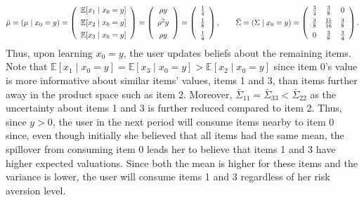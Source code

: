 \documentclass[manuscript]{acmart}
\begin{document}
\[ \bar{\mu} = (\mu \mid x_0=y) =  \left (\begin{array}{c}
\mathbb{E}[x_1\mid x_0=y] \vspace{0.15cm} \\
\mathbb{E}[x_2\mid x_0=y] \vspace{0.15cm} \\
\mathbb{E}[x_3\mid x_0=y]
\end{array}  \right) =\left (\begin{array}{c}
\rho y  \vspace{0.15cm} \\
\rho^{2} y  \vspace{0.15cm} \\
 \rho y \\
\end{array} \right) =
\left (\begin{array}{c}
\frac{1}{4} \vspace{0.15cm} \\
\frac{1}{8}  \vspace{0.15cm} \\
\frac{1}{4}
\end{array}  \right),\qquad 
\bar{\Sigma} =(\Sigma\mid x_0=y)=  \left( \begin{array}{ccc}
\frac{3}{4} & \frac{3}{8} & 0 \vspace{0.15cm} \\
\frac{3}{8} & \frac{15}{16} & \frac{3}{8} \vspace{0.15cm}  \\
0 &\frac{3}{8} & \frac{3}{4}  \\
\end{array} \right).
\]
Thus, upon learning $x_0=y$, the user updates beliefs about the remaining items. Note that $\mathbb{E}[x_1\mid x_0=y] = \mathbb{E}[x_3\mid x_0=y] > \mathbb{E}[x_2\mid x_0=y]$ since item 0's value is more informative about similar items' values, items 1 and 3, than items further away in the product space such as item 2. Moreover, $\bar{\Sigma}_{11} = \bar{\Sigma}_{33} < \bar{\Sigma}_{22}$ as the uncertainty about items 1 and 3 is further reduced compared to item 2. Thus, since $y > 0$, the user in the next period will consume items nearby to item 0 since, even though initially she believed that all items had the same mean, the spillover from consuming item 0 leads her to believe that items 1 and 3 have higher expected valuations. Since both the mean is higher for these items and the variance is lower, the user will consume items 1 and 3 regardless of her risk aversion level.
\par 
\end{document}
